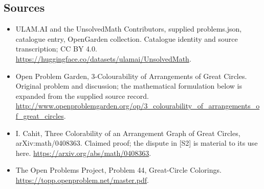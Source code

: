 \documentclass[11pt,a4paper]{article}
\begin{document}
\subsection{Sources}
\begin{itemize}
\item[S1] ULAM.AI and the UnsolvedMath Contributors, supplied problems.json, catalogue entry, OpenGarden collection. Catalogue identity and source transcription; CC BY 4.0.
\url{https://huggingface.co/datasets/ulamai/UnsolvedMath}.
\item[S2] Open Problem Garden, 3-Colourability of Arrangements of Great Circles. Original problem and discussion; the mathematical formulation below is expanded from the supplied source record.
\url{http://www.openproblemgarden.org/op/3_colourability_of_arrangements_of_great_circles}.

\item[R1] I. Cahit, Three Colorability of an Arrangement Graph of Great
Circles, arXiv:math/0408363. Claimed proof;
the dispute in [S2] is material to its use here.
\url{https://arxiv.org/abs/math/0408363}.
\item[R2] The Open Problems Project, Problem 44, Great-Circle Colorings.
\url{https://topp.openproblem.net/master.pdf}.

\end{itemize}
\end{document}

